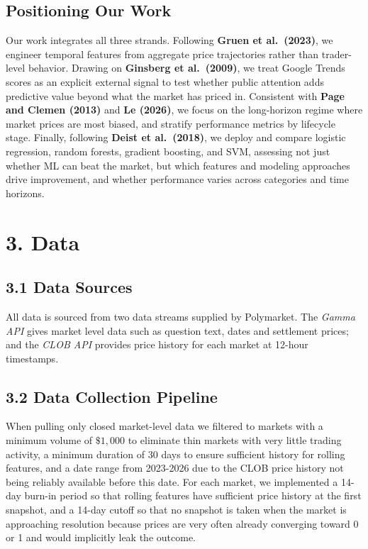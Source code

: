 \documentclass[11pt,twocolumn]{article}
\begin{document}
\subsection*{Positioning Our Work}

Our work integrates all three strands. Following \textbf{Gruen et al.\ (2023)}, we engineer temporal features from aggregate price trajectories rather than trader-level behavior. Drawing on \textbf{Ginsberg et al.\ (2009)}, we treat Google Trends scores as an explicit external signal to test whether public attention adds predictive value beyond what the market has priced in. Consistent with \textbf{Page and Clemen (2013)} and \textbf{Le (2026)}, we focus on the long-horizon regime where market prices are most biased, and stratify performance metrics by lifecycle stage. Finally, following \textbf{Deist et al.\ (2018)}, we deploy and compare logistic regression, random forests, gradient boosting, and SVM, assessing not just whether ML can beat the market, but which features and modeling approaches drive improvement, and whether performance varies across categories and time horizons.
\section*{3. Data}

\subsection*{3.1 Data Sources}

All data is sourced from two data streams supplied by Polymarket. The \textit{Gamma API} gives market level data such as question text, dates and settlement prices; and the \textit{CLOB API} provides price history for each market at 12-hour timestamps.

\subsection*{3.2 Data Collection Pipeline}

When pulling only closed market-level data we filtered to markets with a minimum volume of $\$1,000$ to eliminate thin markets with very little trading activity, a minimum duration of 30 days to ensure sufficient history for rolling features, and a date range from 2023-2026 due to the CLOB price history not being reliably available before this date. For each market, we implemented a 14-day burn-in period so that rolling features have sufficient price history at the first snapshot, and a 14-day cutoff so that no snapshot is taken when the market is approaching resolution because prices are very often already converging toward 0 or 1 and would implicitly leak the outcome.
\end{document}
